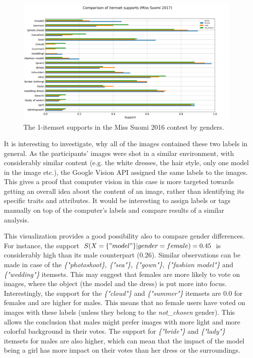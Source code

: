 \begin{figure}[h]
    \begin{center}
        \includegraphics[width=1.0\textwidth]{Images/itemset_supports-gender-Miss_Helsinki-1_itemset.png}
        \caption{The 1-itemset supports in the Miss Suomi 2016 contest by genders.}
        \label{itemset_supports-gender-Miss_Helsinki-1_itemset}
    \end{center}
\end{figure}

It is interesting to investigate, why all of the images contained these two labels in general. As the participants' images were shot in a similar environment, with considerably similar content (e.g. the white dresses, the hair style, only one model in the image etc.), the Google Vision API assigned the same labels to the images. This gives a proof that computer vision in this case is more targeted towards getting an overall idea about the content of an image, rather than identifying its specific traits and attributes. It would be interesting to assign labels or tags manually on top of the computer's labels and compare results of a similar analysis.



This visualization provides a good possibility also to compare gender differences. For instance, the support $S(X=\{"model"\}|gender=female)=0.45$ is considerably high than its male counterpart (0.26). Similar observations can be made in case of the \emph{\{"photo\:shoot\}, \{"sea"\}, \{"gown"\}, \{"fashion model"\}} and \emph{\{"wedding"\}} itemsets. This may suggest that females are more likely to vote on images, where the object (the model and the dress) is put more into focus. Interestingly, the support for the \emph{\{"cloud"\}} and \emph{\{"summer"\}} itemsets are 0.0 for females and are higher for males. This means that no female users have voted on images with these labels (unless they belong to the \emph{not\_chosen} gender). This allows the conclusion that males might prefer images with more light and more colorful background in their votes. The support for \emph{\{"bride"\}} and \emph{\{"lady"\}} itemsets for males are also higher, which can mean that the impact of the model being a girl has more impact on their votes than her dress or the surroundings.

